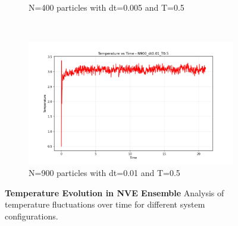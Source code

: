 \begin{figure}[H]
\begin{subfigure}{0.45\textwidth}
		\caption{N=400 particles with dt=0.005 and T=0.5}
		\label{sfig:temp_N400_dt0005}
	\end{subfigure}%
	~
	\begin{subfigure}{0.45\textwidth}
		\includegraphics[width=\textwidth]{media/temp_N900_dt0.01_T0.5.png}
		\caption{N=900 particles with dt=0.01 and T=0.5}
		\label{sfig:temp_N900}
	\end{subfigure}%
	\caption{\textbf{Temperature Evolution in NVE Ensemble} 
	Analysis of temperature fluctuations over time for different system configurations.}
	\label{fig:temperature_evolution}
\end{figure}

